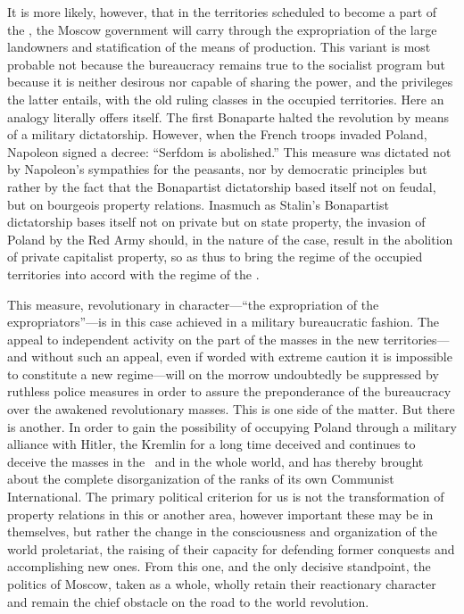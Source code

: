 It is more likely, however, that in the territories scheduled to become a part of the \USSR, the Moscow government will carry through the expropriation of the large landowners and statification of the means of production. This variant is most probable not because the bureaucracy remains true to the socialist program but because it is neither desirous nor capable of sharing the power, and the privileges the latter entails, with the old ruling classes in the occupied territories. Here an analogy literally offers itself. The first Bonaparte halted the revolution by means of a military dictatorship. However, when the French troops invaded Poland, Napoleon signed a decree: “Serfdom is abolished.” This measure was dictated not by Napoleon’s sympathies for the peasants, nor by democratic principles but rather by the fact that the Bonapartist dictatorship based itself not on feudal, but on bourgeois property relations. Inasmuch as Stalin’s Bonapartist dictatorship bases itself not on private but on state property, the invasion of Poland by the Red Army should, in the nature of the case, result in the abolition of private capitalist property, so as thus to bring the regime of the occupied territories into accord with the regime of the \USSR.

This measure, revolutionary in character---``the expropriation of the ex\-pro\-pri\-a\-tors''---is in this case achieved in a military bureaucratic fashion. The appeal to independent activity on the part of the masses in the new territories---and without such an appeal, even if worded with extreme caution it is impossible to constitute a new regime---will on the morrow undoubtedly be suppressed by ruthless police measures in order to assure the preponderance of the bureaucracy over the awakened revolutionary masses. This is one side of the matter. But there is another. In order to gain the possibility of occupying Poland through a military alliance with Hitler, the Kremlin for a long time deceived and continues to deceive the masses in the \USSR\ and in the whole world, and has thereby brought about the complete disorganization of the ranks of its own Communist International. The primary political criterion for us is not the transformation of property relations in this or another area, however important these may be in themselves, but rather the change in the consciousness and organization of the world proletariat, the raising of their capacity for defending former conquests and accomplishing new ones. From this one, and the only decisive standpoint, the politics of Moscow, taken as a whole, wholly retain their reactionary character and remain the chief obstacle on the road to the world revolution.

